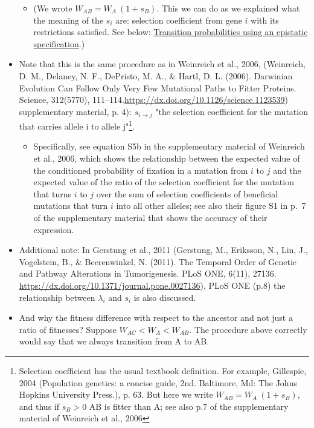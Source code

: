 \documentclass[11pt]{article}
\begin{document}
\begin{itemize}
\begin{itemize}
\item (We wrote \(W_{AB} = W_A \ (1 + s_B)\). This we can do as we explained what the meaning of the \(s_i\) are: selection coefficient from gene \(i\) with its restrictions satisfied. See below: \hyperref[sec:orge68f649]{Transition probabilities using an epistatic specification}.)
\end{itemize}

\item Note that this is the same procedure as in Weinreich et al., 2006, (Weinreich, D. M., Delaney, N. F., DePristo, M. A., \& Hartl, D. L. (2006). Darwinian Evolution Can Follow Only Very Few Mutational Paths to Fitter Proteins. Science, 312(5770), 111–114.\url{https://dx.doi.org/10.1126/science.1123539}) supplementary material, p. 4): \(s_{i \rightarrow j}\) "the selection coefficient for the mutation that carries allele i to allele j"\footnote{Selection coefficient has the usual textbook definition. For example, Gillespie, 2004 (Population genetics: a concise guide, 2nd. Baltimore, Md: The Johns Hopkins University Press.), p. 63. But here we write \(W_{AB} = W_A \ (1 + s_B)\), and thus if \(s_B > 0\) AB is fitter than A; see also p.7 of the supplementary material of Weinreich et al., 2006}.
\begin{itemize}
\item Specifically, see equation S5b in the supplementary material of Weinreich et al., 2006, which shows the relationship between the expected value of the conditioned probability of fixation in a mutation from \(i\) to \(j\) and the expected value of the ratio of the selection coefficient for the mutation that turns \(i\) to \(j\) over the sum of selection coefficients of beneficial mutations that turn \(i\) into all other alleles; see also their figure S1 in p.~7 of the supplementary material that shows the accuracy of their expression.
\end{itemize}

\item Additional note: In Gerstung et al., 2011 (Gerstung, M., Eriksson, N., Lin, J., Vogelstein, B., \& Beerenwinkel, N. (2011). The Temporal Order of Genetic and Pathway Alterations in Tumorigenesis. PLoS ONE, 6(11), 27136. \url{https://dx.doi.org/10.1371/journal.pone.0027136}), PLoS ONE (p.8) the relationship between \(\lambda_i\) and \(s_i\) is also discussed.

\item And why the fitness difference with respect to the ancestor and not just a  ratio of fitnesses? Suppose \(W_{AC} < W_A < W_{AB}\). The procedure above  correctly would say that we always transition from A to AB.


\end{itemize}
\end{document}
